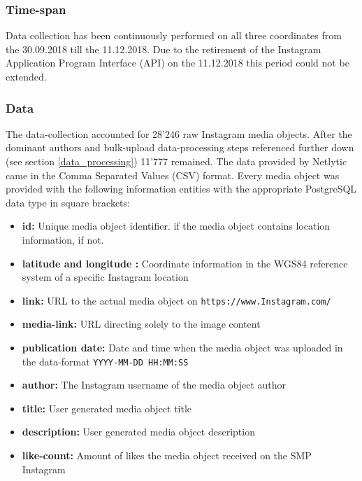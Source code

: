 \subsubsection*{Time-span} \label{Instagram_timespan}
Data collection has been continuously performed on all three coordinates from the 30.09.2018 till the 11.12.2018. Due to the retirement of the Instagram Application Program Interface (API) on the 11.12.2018 \parencite{Instagram2018} this period could not be extended.

\subsubsection*{Data} \label{Instagram_data}
The data-collection accounted for 28'246 raw Instagram media objects. After the dominant authors and bulk-upload data-processing steps referenced further down (see section \ref{data_processing}) 11'777 remained.
The data provided by Netlytic came in the Comma Separated Values (CSV) format. Every media object was provided with the following information entities with the appropriate PostgreSQL data type in square brackets:
\begin{itemize}[label={}]
    \item \textbf{id:} Unique media object identifier.  if the media object contains location information,  if not.
    \item \textbf{latitude and longitude
    :} Coordinate information in the WGS84 reference system of a specific Instagram location 
    \item \textbf{link:} URL to the actual media object on \texttt{https://www.Instagram.com/} 
    \item \textbf{media-link:} URL directing solely to the image content 
    \item \textbf{publication date:} Date and time when the media object was uploaded in the data-format \texttt{YYYY-MM-DD HH:MM:SS} 
    \item \textbf{author:} The Instagram username of the media object author 
    \item \textbf{title:} User generated media object title 
    \item \textbf{description:} User generated media object description 
    \item \textbf{like-count:} Amount of likes the media object received on the SMP Instagram 
\end{itemize}

